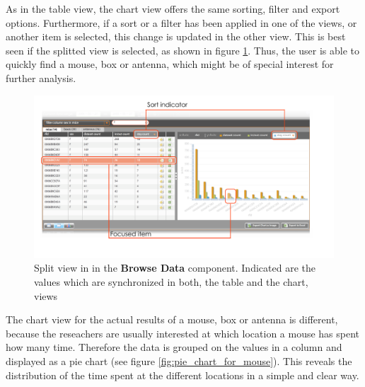 As in the table view, the chart view offers the same sorting, filter and export options. Furthermore, if a sort or a filter has been applied in one of the views, or another item is selected, this change is updated in the other view. This is best seen if the splitted view is selected, as shown in figure \ref{fig:table_chart_view}. Thus, the user is able to quickly find a mouse, box or antenna, which might be of special interest for further analysis.

\begin{figure}[htpb]
\begin{center}
  \includegraphics[width=\textwidth]{assets/pdf/table_chart_view.pdf}
  \caption[Split view]{Split view in in the \textbf{Browse Data} component. Indicated are the values which are synchronized in both, the table and the chart, views}
  \label{fig:table_chart_view}
\end{center}
\end{figure}

The chart view for the actual results of a mouse, box or antenna is different, because the reseachers are usually interested at which location a mouse has spent how many time. Therefore the data is grouped on the values in a column and displayed as a pie chart (see figure \ref{fig:pie_chart_for_mouse}). This reveals the distribution of the time spent at the different locations in a simple and clear way. 

